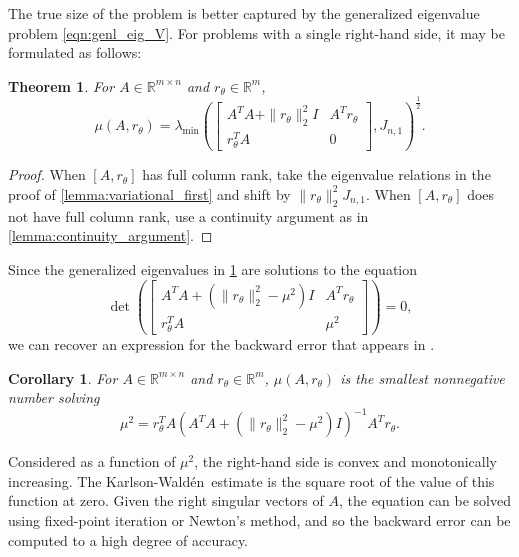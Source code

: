 \documentclass{article}
\newtheorem{theorem}{Theorem}
\newtheorem{corollary}{Corollary}
\newcommand{\ts}{^T}
\newcommand{\KW}{Karlson-Wald\'{e}n~}
\begin{document}
The true size of the problem is better captured by the generalized eigenvalue problem \cref{eqn:genl_eig_V}. For problems with a single right-hand side, it may be formulated as follows:
\begin{theorem}\label{thm:gevp_expression_mu}
    For $A\in \mathbb{R}^{m\times n}$ and $r_\theta\in \mathbb{R}^m$, 
    \begin{equation*}
        \mu(A,r_\theta) = \lambda_{\min}\left(\begin{bmatrix}
            A\ts A + \|r_\theta\|_2^2I & A\ts r_\theta \\
            r_\theta\ts A & 0
        \end{bmatrix}, J_{n,1}\right)^\frac{1}{2}.
    \end{equation*}
\end{theorem}
\begin{proof}
    When $[A,r_\theta]$ has full column rank, take the eigenvalue relations in the proof of \cref{lemma:variational_first} and shift by $\|r_\theta\|_2^2J_{n,1}$. When $[A,r_\theta]$ does not have full column rank, use a continuity argument as in \cref{lemma:continuity_argument}.
\end{proof}
Since the generalized eigenvalues in \cref{thm:gevp_expression_mu} are solutions to the equation 
\[
    \det\left(\begin{bmatrix}
        A\ts A + (\|r_\theta\|_2^2 - \mu^2)I & A\ts r_\theta \\
        r_\theta\ts A & \mu^2
    \end{bmatrix}\right) = 0,
\]
we can recover an expression for the backward error that appears in \cite[(3.13)]{gratton2012accuracy}. 
\begin{corollary}\label{cor:backward_error_fixed_point}
    For $A\in \mathbb{R}^{m\times n}$ and $r_\theta\in \mathbb{R}^m$, $\mu(A,r_\theta)$ is the smallest nonnegative number solving
    \begin{equation*}
        \mu^2 = r_\theta\ts A(A\ts A + (\|r_\theta\|_2^2 - \mu^2)I)^{-1}A\ts r_\theta.
    \end{equation*}
\end{corollary}
Considered as a function of $\mu^2$, the right-hand side is convex and monotonically increasing. The \KW estimate is the square root of the value of this function at zero. Given the right singular vectors of $A$, the equation can be solved using fixed-point iteration or Newton's method, and so the backward error can be computed to a high degree of accuracy.
\end{document}
